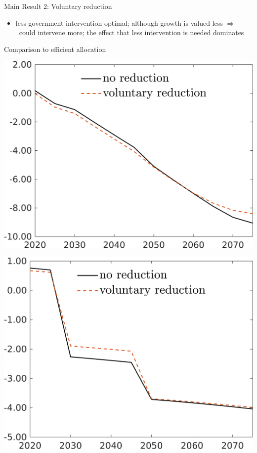 \documentclass[11pt,aspectratio=169]{beamer}
\newcommand{\ar}{$\Rightarrow$ \ }
\begin{document}
\begin{frame}{Main Result 2: Voluntary reduction}
\begin{minipage}[]{0.32\textwidth}
\end{minipage}
\begin{itemize}
	\item less government intervention optimal; although growth is valued less \ar could intervene more; the effect that less intervention is needed dominates
\end{itemize}
\end{frame}


\begin{frame}{Comparison to efficient allocation}
	\centering
\begin{minipage}[]{0.32\textwidth}
	\includegraphics[width=1\textwidth]{../codding_model/own_basedOnFried/optimalPol_elastS_DisuSci/figures/all_1705/C_CompEffOPT_T_NoTaus_spillover0_sep1_BN1_ineq0_redCOMP_etaa0.79_lgd1.png}
\end{minipage}
\begin{minipage}[]{0.32\textwidth}
	\includegraphics[width=1\textwidth]{../codding_model/own_basedOnFried/optimalPol_elastS_DisuSci/figures/all_1705/hhhl_CompEffOPT_T_NoTaus_spillover0_sep1_BN1_ineq0_redCOMP_etaa0.79_lgd1.png}

\end{minipage}
\end{frame}
\end{document}
